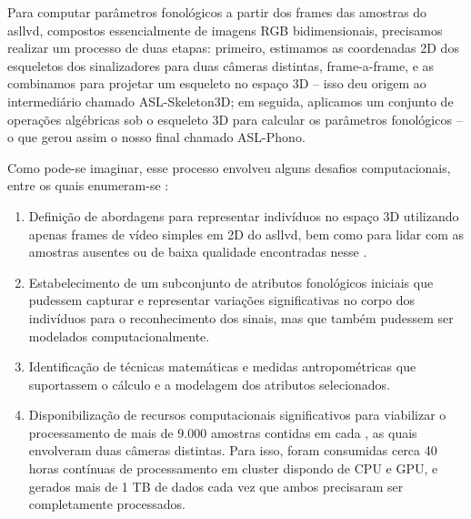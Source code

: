 Para computar parâmetros fonológicos a partir dos frames das amostras do \acrshort{asllvd}, compostos essencialmente de imagens RGB bidimensionais, precisamos realizar um processo de duas etapas: primeiro, estimamos as coordenadas 2D dos esqueletos dos sinalizadores para duas câmeras distintas, frame-a-frame, e as combinamos para projetar um esqueleto no espaço 3D -- isso deu origem ao \dataset intermediário chamado ASL-Skeleton3D; em seguida, aplicamos um conjunto de operações algébricas sob o esqueleto 3D para calcular os parâmetros fonológicos -- o que gerou assim o nosso \dataset final chamado ASL-Phono.

Como pode-se imaginar, esse processo envolveu alguns desafios computacionais, entre os quais enumeram-se :

\begin{enumerate}
    \item Definição de abordagens para representar indivíduos no espaço 3D utilizando apenas frames de vídeo simples em 2D do \acrshort{asllvd}, bem como para lidar com as amostras ausentes ou de baixa qualidade encontradas nesse \dataset.

    \item Estabelecimento de um subconjunto de atributos fonológicos iniciais que pudessem capturar e representar variações significativas no corpo dos indivíduos para o reconhecimento dos sinais, mas que também pudessem ser modelados computacionalmente.
    
    \item Identificação de técnicas matemáticas e medidas antropométricas que suportassem o cálculo e a modelagem dos atributos selecionados.
    
    \item Disponibilização de recursos computacionais significativos para viabilizar o processamento de mais de 9.000 amostras contidas em cada \dataset, as quais envolveram duas câmeras distintas. Para isso, foram consumidas cerca 40 horas contínuas de processamento em cluster dispondo de CPU e GPU, e gerados mais de 1 TB de dados cada vez que ambos \datasets precisaram ser completamente processados.
\end{enumerate}





